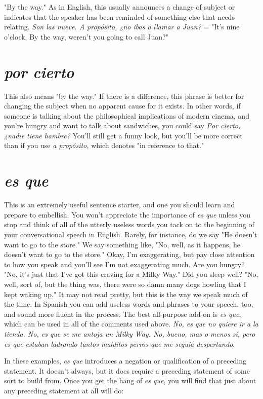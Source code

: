 "By the way." As in English, this usually announces a change
of subject or indicates that the speaker has been reminded of something else that needs relating. \emph{Son las nueve. A propósito, ¿no ibas a
llamar a Juan?} = "It's nine o'clock. By the way, weren't you going to
call Juan?"

\section{\emph{por cierto}}

This also means "by the way." If there is a difference, this
phrase is better for changing the subject when no apparent cause for
it exists. In other words, if someone is talking about the philosophical
implications of modern cinema, and you're hungry and want to talk
about sandwiches, you could say \emph{Por cierto, ¿nadie tiene hambre?}
You'll still get a funny look, but you'll be more correct than if you use
\emph{a propósito,} which denotes "in reference to that."

\section{\emph{es que}}

This is an extremely useful sentence starter, and one you
should learn and prepare to embellish. You won't appreciate the importance of \emph{es que} unless you stop and think of all of the utterly useless
words you tack on to the beginning of your conversational speech in
English. Rarely, for instance, do we say "He doesn't want to go to the
store." We say something like, "No, well, as it happens, he doesn't
want to go to the store." Okay, I'm exaggerating, but pay close attention to how you speak and you'll see I'm not exaggerating much. Are
you hungry? "No, it's just that I've got this craving for a Milky Way."
Did you sleep well? "No, well, sort of, but the thing was, there were
so damn many dogs howling that I kept waking up." It may not read
pretty, but this is the way we speak much of the time. In Spanish you
can add useless words and phrases to your speech, too, and sound more
fluent in the process. The best all-purpose add-on is \emph{es que}, which can
be used in all of the comments used above. \emph{No, es que no quiere ir a
la tienda. No, es que se me antoja un Milky Way. No, bueno, mas o
menos sí, pero es que estaban ladrando tantos malditos perros que
me seguía despertando}.

In these examples, \emph{es que} introduces a negation or qualification of a preceding statement. It doesn't always, but it does require a preceding statement of some sort to build from. Once you get the hang of \emph{es
que}, you will find that just about any preceding statement at all will do:

